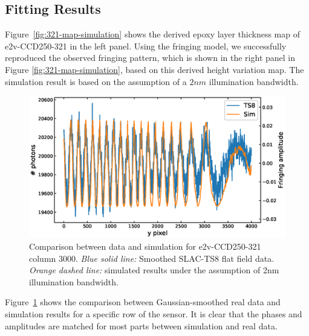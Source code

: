 \documentclass[twocolumn]{aastex63} %
\begin{document}
\begin{CJK*}{UTF8}{gbsn}
\subsection{Fitting Results} \label{sec:Fitting Results}
Figure~\ref{fig:321-map-simulation} shows the derived epoxy layer thickness map of e2v-CCD250-321 in the left panel. Using the fringing model, we successfully reproduced the observed fringing pattern, which is shown in the right panel in Figure \ref{fig:321-map-simulation}, based on this derived height variation map. The simulation result is based on the assumption of a $2nm$ illumination bandwidth.
\begin{figure}[hbt]
\centering
\includegraphics[scale = 0.4]{E2V-321-detail-compare.eps}
\caption{Comparison between data and simulation for e2v-CCD250-321 column 3000. {\it Blue solid line:} Smoothed SLAC-TS8 flat field data. {\it Orange dashed line:} simulated results under the assumption of 2nm illumination bandwidth.}
\label{fig:321-detail-compare}
\end{figure}
Figure~\ref{fig:321-detail-compare} shows the comparison between Gaussian-smoothed real data and simulation results for a specific row of the sensor. It is clear that the phases and amplitudes are matched for most parts between simulation and real data.



\end{CJK*}
\end{document}
